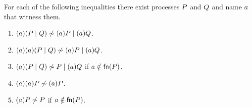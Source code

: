 
\begin{proposition}\label{prop:behavior_auth_and?parallel}
For each of the following inequalities there exist processes $P$ and $Q$ and name $a$ %
 that witness them. %
\begin{enumerate}
\item $(a)(P\;|\;Q) \not\sim (a)P\;|\;(a)Q$.
\item $(a)(a)(P\;|\;Q) \not\sim (a)P\;|\;(a)Q$.
\item $(a)(P\;|\;Q)\not\sim P\;|\;(a)Q$ if $a\notin\mathsf{fn}(P)$.
\item $(a)(a)P \not\sim (a)P$.
\item $(a)P \not\sim P$ if $a\notin\mathsf{fn}(P)$.
\end{enumerate}
\end{proposition}

